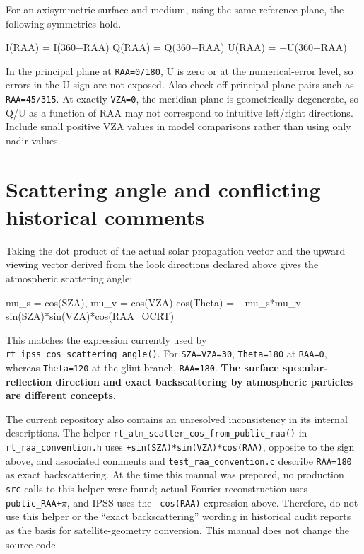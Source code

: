 For an axisymmetric surface and medium, using the same reference plane, the following symmetries hold.


\begin{ManualCode}
I(RAA) =  I(360−RAA)
Q(RAA) =  Q(360−RAA)
U(RAA) = −U(360−RAA)
\end{ManualCode}

In the principal plane at \texttt{RAA=\allowbreak{}0/\allowbreak{}180\textdegree{}}, U is zero or at the numerical-error level, so errors in the U sign are not exposed. Also check off-principal-plane pairs such as \texttt{RAA=\allowbreak{}45/\allowbreak{}315\textdegree{}}. At exactly \texttt{VZA=\allowbreak{}0\textdegree{}}, the meridian plane is geometrically degenerate, so Q/U as a function of RAA may not correspond to intuitive left/right directions. Include small positive VZA values in model comparisons rather than using only nadir values.

\section{Scattering angle and conflicting historical comments}
\label{sec:auto:01_concepts_geometry:7}
Taking the dot product of the actual solar propagation vector and the upward viewing vector derived from the look directions declared above gives the atmospheric scattering angle:


\begin{ManualCode}
mu_s = cos(SZA), mu_v = cos(VZA)
cos(Theta) = −mu_s*mu_v − sin(SZA)*sin(VZA)*cos(RAA_OCRT)
\end{ManualCode}

This matches the expression currently used by \texttt{rt\_\allowbreak{}ipss\_\allowbreak{}cos\_\allowbreak{}scattering\_\allowbreak{}angle()}. For \texttt{SZA=\allowbreak{}VZA=\allowbreak{}30\textdegree{}}, \texttt{Theta=\allowbreak{}180\textdegree{}} at \texttt{RAA=\allowbreak{}0\textdegree{}}, whereas \texttt{Theta=\allowbreak{}120\textdegree{}} at the glint branch, \texttt{RAA=\allowbreak{}180\textdegree{}}. \textbf{The surface specular-reflection direction and exact backscattering by atmospheric particles are different concepts.}

The current repository also contains an unresolved inconsistency in its internal descriptions. The helper \texttt{rt\_\allowbreak{}atm\_\allowbreak{}scatter\_\allowbreak{}cos\_\allowbreak{}from\_\allowbreak{}public\_\allowbreak{}raa()} in \texttt{rt\_\allowbreak{}raa\_\allowbreak{}convention.\allowbreak{}h} uses \texttt{+sin(SZA)*sin(VZ\allowbreak{}A)*cos(RAA)}, opposite to the sign above, and associated comments and \texttt{test\_\allowbreak{}raa\_\allowbreak{}convention.\allowbreak{}c} describe \texttt{RAA=\allowbreak{}180\textdegree{}} as exact backscattering. At the time this manual was prepared, no production \texttt{src} calls to this helper were found; actual Fourier reconstruction uses \texttt{public\_\allowbreak{}RAA+\ensuremath{\pi}}, and IPSS uses the \texttt{-cos(RAA)} expression above. Therefore, do not use this helper or the “exact backscattering” wording in historical audit reports as the basis for satellite-geometry conversion. This manual does not change the source code.

